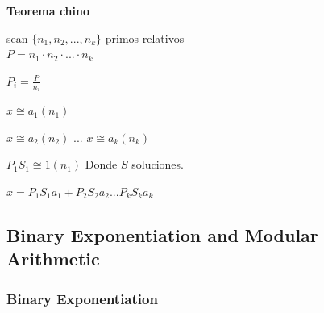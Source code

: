 \textbf{Teorema chino}

sean $\{n_{1}, n_{2},..., n_{k} \}$ primos relativos\\

$P = n_{1}\cdot n_{2}\cdot ...\cdot n_{k}$

$P_{i} = \frac{P}{n_{i}}$

$x\cong a_{1}(n_{1})$

$x\cong a_{2}(n_{2})$
$...$
$x\cong a_{k}(n_{k})$

$P_{1}S_{1} \cong 1(n_{1})$ Donde $S$ soluciones.

$x = P_{1}S_{1}a_{1} + P_{2}S_{2}a_{2} ... P_{k}S_{k}a_{k}$


\subsection{Binary Exponentiation and Modular Arithmetic}
\subsubsection{Binary Exponentiation}
